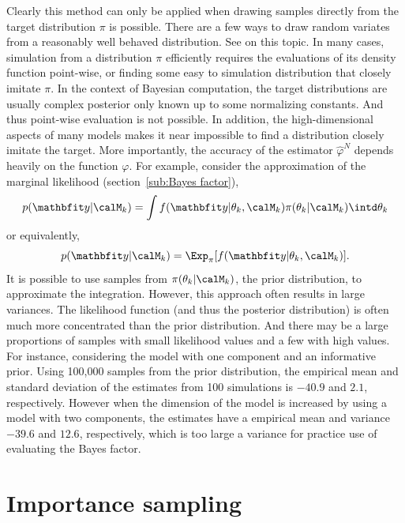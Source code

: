 Clearly this method can only be applied when drawing samples directly from the
target distribution $\pi$ is possible. There are a few ways to draw random
variates from a reasonably well behaved distribution. See
\cite[][chap.~2]{Robert:2004tn} on this topic. In many cases, simulation from
a distribution $\pi$ efficiently requires the evaluations of its density
function point-wise, or finding some easy to simulation distribution that
closely imitate $\pi$. In the context of Bayesian computation, the target
distributions are usually complex posterior only known up to some normalizing
constants. And thus point-wise evaluation is not possible. In addition, the
high-dimensional aspects of many models makes it near impossible to find a
distribution closely imitate the target. More importantly, the accuracy of the
estimator $\hat\varphi^N$ depends heavily on the function $\varphi$. For
example, consider the approximation of the marginal likelihood
(section~\ref{sub:Bayes factor}),
\begin{equation*}
  p(\data|\calM_k) =
  \int f(\data|\theta_k,\calM_k)\pi(\theta_k|\calM_k) \intd \theta_k
\end{equation*}
or equivalently,
\begin{equation*}
  p(\data|\calM_k) = \Exp_{\pi}[f(\data|\theta_k,\calM_k)].
  \label{eq:prior expectation}
\end{equation*}
It is possible to use samples from $\pi(\theta_k|\calM_k)$, the prior
distribution, to approximate the integration. However, this approach often
results in large variances. The likelihood function (and thus the posterior
distribution) is often much more concentrated than the prior distribution. And
there may be a large proportions of samples with small likelihood values and a
few with high values. For instance, considering the \pet model with one
component and an informative prior. Using 100,000 samples from the prior
distribution, the empirical mean and standard deviation of the estimates from
100 simulations is $-40.9$ and $2.1$, respectively. However when the dimension
of the model is increased by using a model with two components, the estimates
have a empirical mean and variance $-39.6$ and $12.6$, respectively, which is
too large a variance for practice use of evaluating the Bayes factor.

\section{Importance sampling}
\label{sec:Importance sampling}

